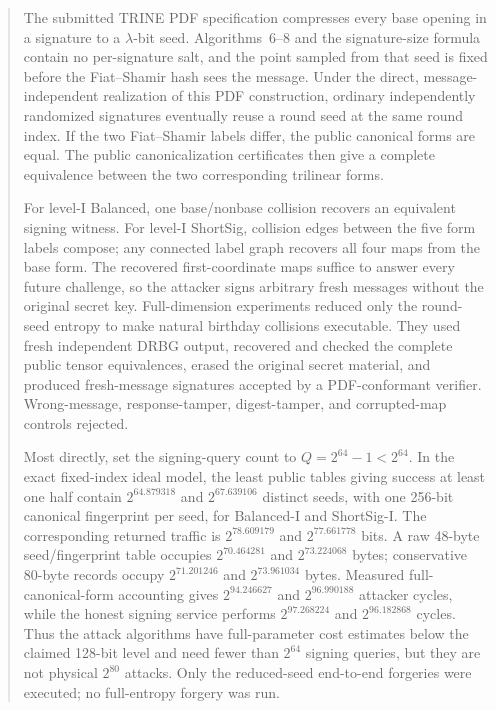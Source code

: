 \documentclass[11pt,a4paper]{article}
\begin{document}
\begin{abstract}
The submitted TRINE PDF specification compresses every base opening in a signature
to a $\lambda$-bit seed.  Algorithms~6--8 and the signature-size formula contain
no per-signature salt, and the point sampled from that seed is fixed before the
Fiat--Shamir hash sees the message.  Under the direct, message-independent
realization of this PDF construction, ordinary independently randomized
signatures eventually reuse a round seed at the same round index.  If the two
Fiat--Shamir labels differ, the public canonical forms are equal.  The public
canonicalization certificates then give a complete equivalence between the two
corresponding trilinear forms.

For level-I Balanced, one base/nonbase collision recovers an equivalent signing
witness.  For level-I ShortSig, collision edges between the five form labels
compose; any connected label graph recovers all four maps from the base form.
The recovered first-coordinate maps suffice to answer every future challenge,
so the attacker signs arbitrary fresh messages without the original secret key.
Full-dimension experiments reduced only the round-seed entropy to make natural
birthday collisions executable.  They used fresh independent DRBG output,
recovered and checked the complete public tensor equivalences, erased the
original secret material, and produced fresh-message signatures accepted by a
PDF-conformant verifier.  Wrong-message, response-tamper, digest-tamper, and
corrupted-map controls rejected.

Most directly, set the signing-query count to
$Q=2^{64}-1<2^{64}$.  In the exact fixed-index ideal model, the least public
tables giving success at least one half contain $2^{64.879318}$ and
$2^{67.639106}$ distinct seeds, with one 256-bit canonical fingerprint per
seed, for Balanced-I and ShortSig-I.  The corresponding returned traffic is
$2^{78.609179}$ and $2^{77.661778}$ bits.  A raw 48-byte seed/fingerprint
table occupies $2^{70.464281}$ and $2^{73.224068}$ bytes; conservative 80-byte
records occupy $2^{71.201246}$ and $2^{73.961034}$ bytes.  Measured
full-canonical-form accounting gives $2^{94.246627}$ and $2^{96.990188}$
attacker cycles, while the honest signing service performs $2^{97.268224}$
and $2^{96.182868}$ cycles.  Thus the attack algorithms have full-parameter
cost estimates below the claimed 128-bit level and need fewer than $2^{64}$
signing queries, but they are not physical $2^{80}$ attacks.  Only the
reduced-seed end-to-end forgeries were executed; no full-entropy forgery was
run.


\end{abstract}
\end{document}
